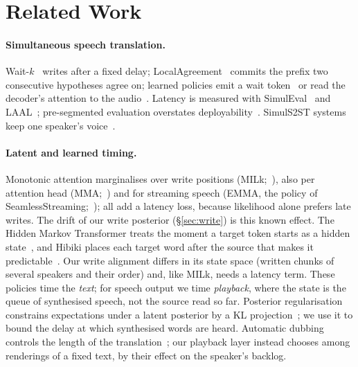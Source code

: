 \section{Related Work}
\label{sec:related}

\paragraph{Simultaneous speech translation.} Wait-$k$~\citep{ma2019stacl} writes after a fixed delay;
LocalAgreement~\citep{liu2020low,polak2022cuni,machacek2023turning} commits the prefix two consecutive hypotheses agree
on; learned policies emit a wait token~\citep{koshkin2024transllama} or read the decoder's attention to the
audio~\citep{papi2023edatt,papi2024streamatt}. Latency is measured with SimulEval~\citep{ma2020simuleval} and LAAL~\citep{papi2022over};
pre-segmented evaluation overstates deployability~\citep{papi2025real}. SimulS2ST systems
keep one speaker's voice~\citep{zhang2024streamspeech,seamless2023,labiausse2025hibiki,cheng2025liveinterpret,he2026simuls2st,deng2025simuls2s}.

\paragraph{Latent and learned timing.} Monotonic attention marginalises over write positions
(MILk;~\citealp{arivazhagan2019milk}), also per attention head (MMA;~\citealp{ma2020mma}) and for streaming speech (EMMA,
the policy of SeamlessStreaming;~\citealp{ma2023emma}); all add a latency loss, because likelihood alone prefers late
writes. The drift of our write posterior (\S\ref{sec:write}) is this known effect. The Hidden Markov Transformer
treats the moment a target token starts as a hidden state~\citep{zhang2023hmt}, and Hibiki places each target word after the source that makes it
predictable~\citep{labiausse2025hibiki}. Our write alignment differs in its state space (written chunks of several
speakers and their order) and, like MILk, needs a latency term. These policies time the \emph{text}; for speech output we time
\emph{playback}, where the state is the queue of synthesised speech, not the source read so far. Posterior
regularisation constrains expectations under a latent posterior by a KL projection~\citep{ganchev2010posterior}; we use
it to bound the delay at which synthesised words are heard. Automatic dubbing controls the length of the
translation~\citep{lakew2022isometric}; our playback layer instead chooses among renderings of a fixed text, by their
effect on the speaker's backlog.

